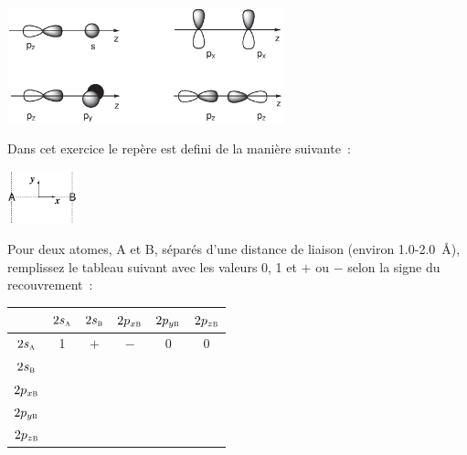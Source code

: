 \vspace{-0.3cm}
\begin{center}
\includegraphics[width=8.0cm]{figure/overl1.eps}
\end{center}


Dans cet exercice le rep\`ere est defini de la mani\`ere suivante~:

\includegraphics[width=2cm]{figure/AB_repere_yx.eps}

Pour deux atomes, A et B, s\'epar\'es d'une distance de liaison 
(environ 1.0-2.0~\AA), remplissez le tableau suivant avec les valeurs 0, 1 et $+$ ou $-$
selon la signe du recouvrement~:
%

\begin{tabular}{|c||c|c|c|c|c|}
\hline
                   & $2s_\textsc{a}$ & $2s_\textsc{b}$ & $2p_{x\textsc{b}}$ & $2p_{y\textsc{b}}$ & $2p_{z\textsc{b}}$ \\
\hline\hline
$2s_\textsc{a}$     & 1 & $+$ & $-$ & 0 & 0 \\ \hline
$2s_\textsc{b}$     &&&&& \\ \hline
$2p_{x\textsc{b}}$  &&&&& \\ \hline
$2p_{y\textsc{b}}$  &&&&& \\ \hline
$2p_{z\textsc{b}}$  &&&&& \\ \hline
\end{tabular}
